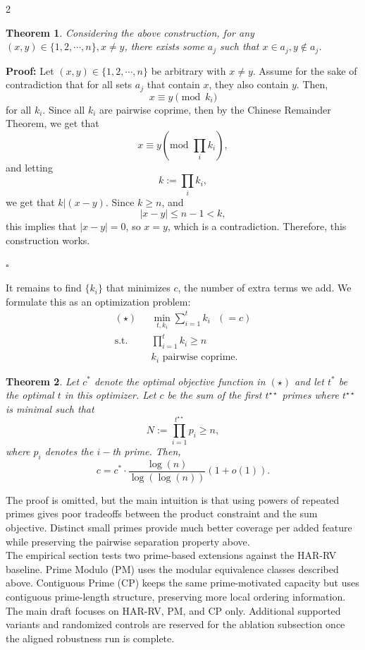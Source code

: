 \documentclass[a4paper]{article}
\newtheorem{theorem}{Theorem}
\begin{document}
\begin{multicols}{2}
\begin{theorem}
    Considering the above construction, for any $(x, y) \in \{1, 2, \cdots, n\}, x\neq y$, there exists some $a_j$ such that $x \in a_j, y \notin a_j$.
\end{theorem}
\noindent \textbf{Proof: }Let $(x, y) \in \{1, 2, \cdots, n\}$ be arbitrary with $x \neq y$. Assume for the sake of contradiction that for all sets $a_j$ that contain $x$, they also contain $y$. Then, $$x \equiv y \pmod{k_i}$$ for all $k_i$. Since all $k_i$ are pairwise coprime, then by the Chinese Remainder Theorem, we get that $$x \equiv y \left(\text{mod }\displaystyle\prod_i k_i\right),$$ and letting $$k := \displaystyle\prod_i k_i,$$we get that $k | (x-y)$. Since $k \geq n$, and $$|x-y| \leq n-1 < k,$$ this implies that $|x-y| = 0$, so $x=y$, which is a contradiction. Therefore, this construction works.
\begin{flushright}
  $\square$
\end{flushright}
\vspace{0.3cm}
\noindent It remains to find $\{k_i\}$ that minimizes $c$, the number of extra terms we add. We formulate this as an optimization problem:
\vspace{0.3cm}
\begin{align*}
    (\star) & \text{ } \min_{t, k_i} \displaystyle\sum_{i=1}^t k_i \text{ }(= c)
    \\ \text{s.t.} & \text{ }\prod_{i=1}^t k_i \geq n
    \\ &\text{ $k_i$ pairwise coprime}.
\end{align*}
\vspace{0.3cm}
\begin{theorem}
    Let $c^*$ denote the optimal objective function in $(\star)$ and let $t^*$ be the optimal $t$ in this optimizer. Let $c$ be the sum of the first $t^{\star\star}$ primes where $t^{\star\star}$ is minimal such that $$N := \displaystyle\prod_{i=1}^{t^{\star\star}} p_i \geq n,$$where $p_i$ denotes the $i-$th prime. Then, $$c = c^* \cdot \frac{\log(n)}{\log(\log(n))}(1+o(1)).$$
\end{theorem}
\vspace{0.3cm}
\noindent The proof is omitted, but the main intuition is that using powers of repeated primes gives poor tradeoffs between the product constraint and the sum objective. Distinct small primes provide much better coverage per added feature while preserving the pairwise separation property above.
\vspace{0.3cm}
\\ The empirical section tests two prime-based extensions against the HAR-RV baseline. Prime Modulo (PM) uses the modular equivalence classes described above. Contiguous Prime (CP) keeps the same prime-motivated capacity but uses contiguous prime-length structure, preserving more local ordering information. The main draft focuses on HAR-RV, PM, and CP only. Additional supported variants and randomized controls are reserved for the ablation subsection once the aligned robustness run is complete.

\end{multicols}
\end{document}
